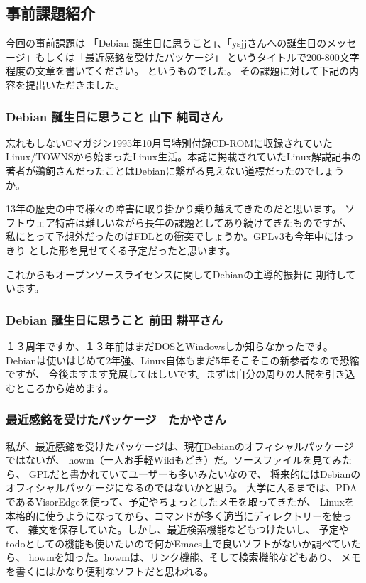 \documentclass[mingoth,a4paper]{jsarticle}
\begin{document}
\subsection{事前課題紹介}

今回の事前課題は
「Debian 誕生日に思うこと」、「ysjjさんへの誕生日のメッセージ」もしくは「最近感銘を受けたパッケージ」
というタイトルで200-800文字程度の文章を書いてください。
というものでした。
その課題に対して下記の内容を提出いただきました。

\subsubsection{Debian 誕生日に思うこと 山下 純司さん}

忘れもしないCマガジン1995年10月号特別付録CD-ROMに収録されていた
Linux/TOWNSから始まったLinux生活。本誌に掲載されていたLinux解説記事の
著者が鵜飼さんだったことはDebianに繋がる見えない道標だったのでしょうか。

13年の歴史の中で様々の障害に取り掛かり乗り越えてきたのだと思います。
ソフトウェア特許は難しいながら長年の課題としてあり続けてきたものですが、
私にとって予想外だったのはFDLとの衝突でしょうか。GPLv3も今年中にはっきり
とした形を見せてくる予定だったと思います。

これからもオープンソースライセンスに関してDebianの主導的振舞に
期待しています。

\subsubsection{Debian 誕生日に思うこと 前田 耕平さん}

１３周年ですか、１３年前はまだDOSとWindowsしか知らなかったです。
Debianは使いはじめて2年強、Linux自体もまだ5年そこそこの新参者なので恐縮ですが、
今後ますます発展してほしいです。まずは自分の周りの人間を引き込むところから始めます。

\subsubsection{最近感銘を受けたパッケージ　たかやさん}

私が、最近感銘を受けたパッケージは、現在Debianのオフィシャルパッケージではないが、
howm（一人お手軽Wikiもどき）だ。ソースファイルを見てみたら、
GPLだと書かれていてユーザーも多いみたいなので、
将来的にはDebianのオフィシャルパッケージになるのではないかと思う。
大学に入るまでは、PDAであるVisorEdgeを使って、予定やちょっとしたメモを取ってきたが、
Linuxを本格的に使うようになってから、コマンドが多く適当にディレクトリーを使って、
雑文を保存していた。しかし、最近検索機能などもつけたいし、
予定やtodoとしての機能も使いたいので何かEmacs上で良いソフトがないか調べていたら、
howmを知った。howmは、リンク機能、そして検索機能などもあり、
メモを書くにはかなり便利なソフトだと思われる。
\end{document}
